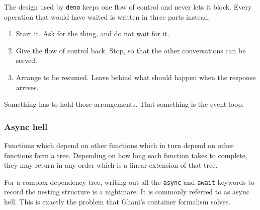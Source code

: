 \documentclass[aspectratio=169,12pt]{beamer}
\begin{document}
\begin{frame}
\vfill
\begin{center}
\begin{minipage}{0.92\textwidth}
\raggedright
\large

The design used by \texttt{deno} keeps one flow of control and never lets it block. Every
operation that would have waited is written in three parts instead.

\medskip

\begin{enumerate}\setlength{\itemsep}{0.4em}
\item Start it. Ask for the thing, and do not wait for it.
\item Give the flow of control back. Stop, so that the other conversations can be served.
\item Arrange to be resumed. Leave behind what should happen when the response arrives.
\end{enumerate}

\medskip

Something has to hold those arrangements. That something is the event loop.

\end{minipage}
\end{center}
\vfill
\end{frame}

\begin{frame}
\frametitle{Async hell}
\vfill
\begin{center}
\begin{minipage}{0.92\textwidth}
\raggedright
\large

Functions which depend on other functions which in turn depend on other functions form a tree.
Depending on how long each function takes to complete, they may return in any order which is a
linear extension of that tree.

\medskip

For a complex dependency tree, writing out all the \texttt{async} and \texttt{await} keywords to
record the nesting structure is a nightmare. It is commonly referred to as async hell. This is
exactly the problem that Ghani's container formalism solves.

\end{minipage}
\end{center}
\vfill
\end{frame}
\end{document}
